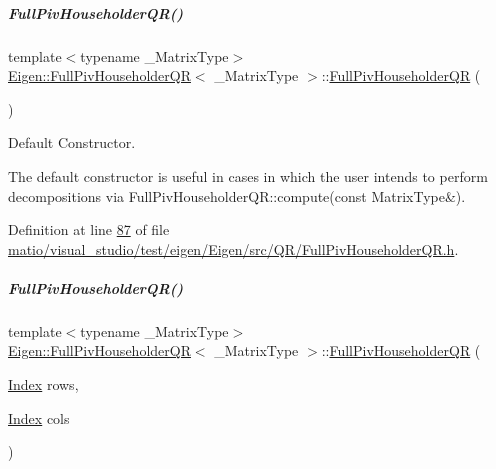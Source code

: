 \mbox{\label{group___q_r___module_aeb14b4c1eef33128207b40a00bd0bd08}} 
\subparagraph{\texorpdfstring{Full\+Piv\+Householder\+Q\+R()}{FullPivHouseholderQR()}\hspace{0.1cm}{\footnotesize\ttfamily [5/8]}}
{\footnotesize\ttfamily template$<$typename \+\_\+\+Matrix\+Type$>$ \\
\hyperlink{group___q_r___module_class_eigen_1_1_full_piv_householder_q_r}{Eigen\+::\+Full\+Piv\+Householder\+QR}$<$ \+\_\+\+Matrix\+Type $>$\+::\hyperlink{group___q_r___module_class_eigen_1_1_full_piv_householder_q_r}{Full\+Piv\+Householder\+QR} (\begin{DoxyParamCaption}{ }\end{DoxyParamCaption})\hspace{0.3cm}{\ttfamily [inline]}}



Default Constructor. 

The default constructor is useful in cases in which the user intends to perform decompositions via Full\+Piv\+Householder\+Q\+R\+::compute(const Matrix\+Type\&). 

Definition at line \hyperlink{matio_2visual__studio_2test_2eigen_2_eigen_2src_2_q_r_2_full_piv_householder_q_r_8h_source_l00087}{87} of file \hyperlink{matio_2visual__studio_2test_2eigen_2_eigen_2src_2_q_r_2_full_piv_householder_q_r_8h_source}{matio/visual\+\_\+studio/test/eigen/\+Eigen/src/\+Q\+R/\+Full\+Piv\+Householder\+Q\+R.\+h}.

\mbox{\label{group___q_r___module_abf722e1dc7241a5d6f76460ef0c87821}} 
\subparagraph{\texorpdfstring{Full\+Piv\+Householder\+Q\+R()}{FullPivHouseholderQR()}\hspace{0.1cm}{\footnotesize\ttfamily [6/8]}}
{\footnotesize\ttfamily template$<$typename \+\_\+\+Matrix\+Type$>$ \\
\hyperlink{group___q_r___module_class_eigen_1_1_full_piv_householder_q_r}{Eigen\+::\+Full\+Piv\+Householder\+QR}$<$ \+\_\+\+Matrix\+Type $>$\+::\hyperlink{group___q_r___module_class_eigen_1_1_full_piv_householder_q_r}{Full\+Piv\+Householder\+QR} (\begin{DoxyParamCaption}\item[{\hyperlink{namespace_eigen_a62e77e0933482dafde8fe197d9a2cfde}{Index}}]{rows,  }\item[{\hyperlink{namespace_eigen_a62e77e0933482dafde8fe197d9a2cfde}{Index}}]{cols }\end{DoxyParamCaption})\hspace{0.3cm}{\ttfamily [inline]}}



